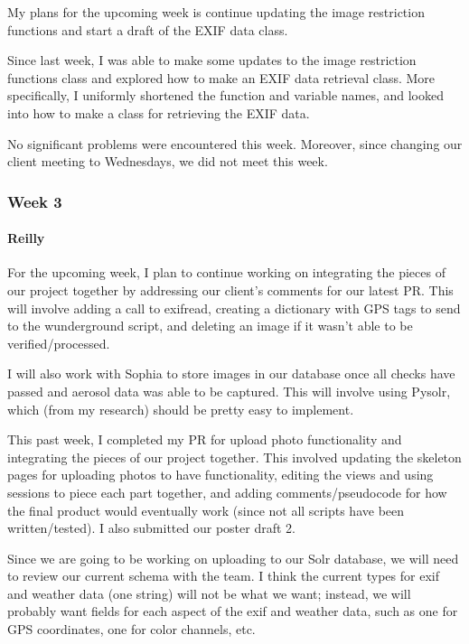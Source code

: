 \documentclass[onecolumn, draftclsnofoot,10pt, compsoc]{IEEEtran}
\begin{document}
\begin{flushleft}
My plans for the upcoming week is continue updating the image restriction functions and start a draft of the EXIF data class.
 
 
Since last week, I was able to make some updates to the image restriction functions class and explored how to make an EXIF data retrieval class. More specifically, I uniformly shortened the function and variable names, and looked into how to make a class for retrieving the EXIF data.
 
 
No significant problems were encountered this week. Moreover, since changing our client meeting to Wednesdays, we did not meet this week.
 
\subsubsection{Week 3}
\paragraph{Reilly}
 
For the upcoming week, I plan to continue working on integrating the pieces of our project together by addressing our client's comments for our latest PR. This will involve adding a call to exifread, creating a dictionary with GPS tags to send to the wunderground script, and deleting an image if it wasn't able to be verified/processed.
 
I will also work with Sophia to store images in our database once all checks have passed and aerosol data was able to be captured. This will involve using Pysolr, which (from my research) should be pretty easy to implement.
 
 
This past week, I completed my PR for upload photo functionality and integrating the pieces of our project together. This involved updating the skeleton pages for uploading photos to have functionality, editing the views and using sessions to piece each part together, and adding comments/pseudocode for how the final product would eventually work (since not all scripts have been written/tested). I also submitted our poster draft 2.
 
 
Since we are going to be working on uploading to our Solr database, we will need to review our current schema with the team. I think the current types for exif and weather data (one string) will not be what we want; instead, we will probably want fields for each aspect of the exif and weather data, such as one for GPS coordinates, one for color channels, etc.
 

\end{flushleft}
\end{document}
